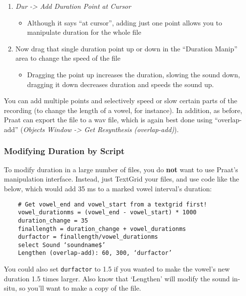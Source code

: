 \begin{enumerate}
\def\labelenumi{\arabic{enumi}.}
\tightlist
\item
  \emph{Dur -\textgreater{} Add Duration Point at Cursor}

  \begin{itemize}
  \tightlist
  \item
    Although it says ``at cursor'', adding just one point allows you to
    manipulate duration for the whole file
  \end{itemize}
\item
  Now drag that single duration point up or down in the ``Duration
  Manip'' area to change the speed of the file

  \begin{itemize}
  \tightlist
  \item
    Dragging the point up increases the duration, slowing the sound
    down, dragging it down decreases duration and speeds the sound up.
  \end{itemize}
\end{enumerate}

You can add multiple points and selectively speed or slow certain parts
of the recording (to change the length of a vowel, for instance). In
addition, as before, Praat can export the file to a wav file, which is
again best done using ``overlap-add'' (\emph{Objects Window
-\textgreater{} Get Resynthesis (overlap-add)}).

\hypertarget{modifying-duration-by-script}{%
\subsubsection{Modifying Duration by
Script}\label{modifying-duration-by-script}}

To modify duration in a large number of files, you do \textbf{not} want
to use Praat's manipulation interface. Instead, just TextGrid your
files, and use code like the below, which would add 35 ms to a marked
vowel interval's duration:

\begin{verbatim}
    # Get vowel_end and vowel_start from a textgrid first!
    vowel_durationms = (vowel_end - vowel_start) * 1000
    duration_change = 35
    finallength = duration_change + vowel_durationms
    durfactor = finallength/vowel_durationms
    select Sound ‘soundname$’
    Lengthen (overlap-add): 60, 300, ‘durfactor’
\end{verbatim}

You could also set \texttt{durfactor} to 1.5 if you wanted to make the
vowel's new duration 1.5 times larger. Also know that `Lengthen' will
modify the sound in-situ, so you'll want to make a copy of the file.

